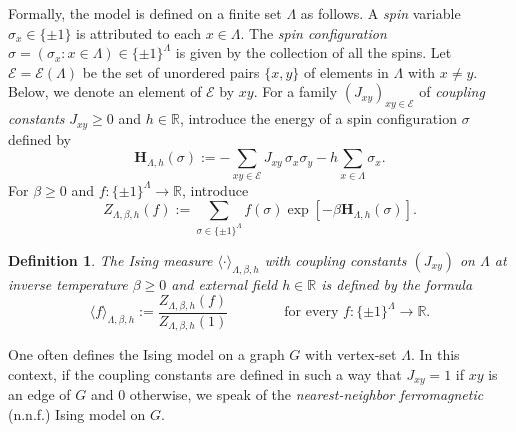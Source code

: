 \documentclass[a4paper,oneside,11pt]{article}
\newtheorem{definition}[theorem]{Definition}
\newcommand{\ee}{\end{equation}}
\newcommand{\be}{\begin{equation}}
\begin{document}
Formally, the model is defined on a finite set $\Lambda$ as follows. A {\em spin} variable $\sigma_x\in\{\pm1\}$ is attributed to each $x\in \Lambda$. The
 {\em spin configuration} $\sigma=(\sigma_x:x\in \Lambda)\in\{\pm1\}^{\Lambda}$ is given by the collection of all the spins.
Let $\mathcal E=\mathcal E(\Lambda)$ be the set of unordered pairs $\{x,y\}$ of elements in $\Lambda$ with $x\ne y$. Below, we denote an element of $\mathcal E$ by $xy$. For a family $(J_{xy})_{xy\in\mathcal E}$ of {\em coupling constants} $J_{xy}\ge0$ and $h\in\mathbb R$, introduce the energy of a spin configuration $\sigma$ defined by
$$\mathbf H_{\Lambda,h}(\sigma):=-\sum_{xy\in\mathcal E}J_{xy}\,\sigma_x\sigma_y-h\sum_{x\in \Lambda}\sigma_x.$$
For $\beta\ge0$ and $f:\{\pm1\}^{\Lambda}\longrightarrow \mathbb  R$, introduce
\be\label{eq:4}Z_{\Lambda,\beta,h}(f):=\sum_{\sigma\in\{\pm1\}^{\Lambda}}f(\sigma)\exp[-\beta\mathbf H_{\Lambda,h}(\sigma)].\ee
\begin{definition}The Ising measure $\langle \cdot\rangle_{\Lambda,\beta,h}$ with coupling constants $(J_{xy})$ on $\Lambda$ at inverse temperature $\beta\ge0$ and external field $h\in\mathbb R$ is defined by the formula
\be\label{eq:Gibbs}\langle f\rangle_{\Lambda,\beta,h}:=\frac{Z_{\Lambda,\beta,h}(f)}{Z_{\Lambda,\beta,h}(1)}\qquad\qquad\text{for every $f:\{\pm1\}^{\Lambda}\longrightarrow \mathbb  R$.}\ee
\end{definition}
One often defines the Ising model on a graph $G$ with vertex-set $\Lambda$. In this context, if the coupling constants are defined in such a way that $J_{xy}=1$ if $xy$ is an edge of $G$ and 0 otherwise,
we speak of the  {\em nearest-neighbor ferromagnetic} (n.n.f.) Ising model on $G$. %
\end{document}
